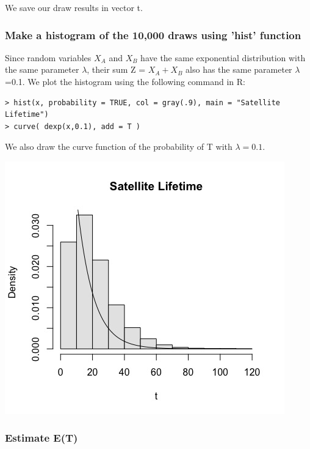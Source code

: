 \documentclass[12pt,letterpaper,titlepage,en-US]{article}
\begin{document}
We save our draw results in vector t.


\subsubsection{Make a histogram of the 10,000 draws using 'hist' function}
Since random variables $X_{A}$ and $X_{B}$ have the same exponential distribution with the same parameter $\lambda$, their sum Z = $X_{A} + X_{B}$ also has the same parameter $\lambda$=0.1.
We plot the histogram using the following command in R:
\begin{knitrout}
\color{fgcolor}
\begin{kframe}

\begin{verbatim}
> hist(x, probability = TRUE, col = gray(.9), main = "Satellite Lifetime")
> curve( dexp(x,0.1), add = T )
\end{verbatim}
\end{kframe}
\end{knitrout}

We also draw the curve function of the probability of T with $\lambda=0.1$.
\begin{center}
\includegraphics[scale=0.6]{hist.jpeg}
\end{center}

\subsubsection{Estimate E(T)}
\end{document}
